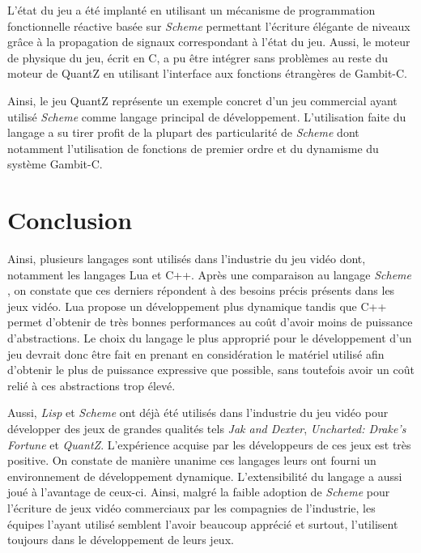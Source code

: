 \documentclass[12pt,twoside,letterpaper,francais]{book}
\newcommand{\lisp}{{\textit{Lisp }}}
\newcommand{\Schemelang}{{\textit{Scheme }}}
\begin{document}
L'état du jeu a été implanté en utilisant un mécanisme de
programmation fonctionnelle réactive basée sur \Schemelang permettant
l'écriture élégante de niveaux grâce à la propagation de signaux
correspondant à l'état du jeu. Aussi, le moteur de physique du jeu,
écrit en C, a pu être intégrer sans problèmes au reste du moteur de
QuantZ en utilisant l'interface aux fonctions étrangères de Gambit-C.

Ainsi, le jeu QuantZ représente un exemple concret d'un jeu commercial
ayant utilisé \Schemelang comme langage principal de
développement. L'utilisation faite du langage a su tirer profit de la
plupart des particularité de \Schemelang dont notamment l'utilisation
de fonctions de premier ordre et du dynamisme du système Gambit-C.


\FloatBarrier
\section{Conclusion}
Ainsi, plusieurs langages sont utilisés dans l'industrie du jeu vidéo
dont, notamment les langages Lua et C++. Après une comparaison au
langage \Schemelang, on constate que ces derniers répondent à des
besoins précis présents dans les jeux vidéo. Lua propose un
développement plus dynamique tandis que C++ permet d'obtenir de très
bonnes performances au coût d'avoir moins de puissance
d'abstractions. Le choix du langage le plus approprié pour le
développement d'un jeu devrait donc être fait en prenant en
considération le matériel utilisé afin d'obtenir le plus de puissance
expressive que possible, sans toutefois avoir un coût relié à ces
abstractions trop élevé.

Aussi, \lisp et \Schemelang ont déjà été utilisés dans l'industrie du
jeu vidéo pour développer des jeux de grandes qualités tels
\textit{Jak and Dexter}, \textit{Uncharted: Drake's Fortune} et
\textit{QuantZ}. L'expérience acquise par les développeurs de ces jeux
est très positive. On constate de manière unanime ces langages leurs
ont fourni un environnement de développement
dynamique. L'extensibilité du langage a aussi joué à l'avantage de
ceux-ci. Ainsi, malgré la faible adoption de \Schemelang pour
l'écriture de jeux vidéo commerciaux par les compagnies de
l'industrie, les équipes l'ayant utilisé semblent l'avoir beaucoup
apprécié et surtout, l'utilisent toujours dans le développement de
leurs jeux.

\clearpage

\end{document}
